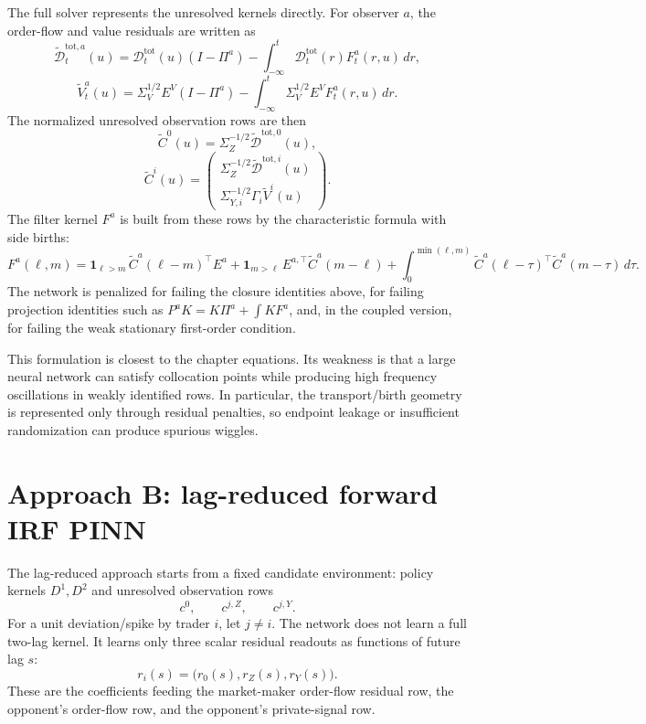 \documentclass[11pt]{article}
\newcommand{\Dt}{\widetilde{\mathcal D}}
\newcommand{\Vt}{\widetilde V}
\newcommand{\calD}{\mathcal D}
\newcommand{\dd}{\,d}
\begin{document}
The full solver represents the unresolved kernels directly.  For observer
\(a\), the order-flow and value residuals are written as
\[
  \Dt^{\mathrm{tot},a}_t(u)
  =
  \calD^{\mathrm{tot}}_t(u)(I-\Pi^a)
  -
  \int_{-\infty}^t
    \calD^{\mathrm{tot}}_t(r)F^a_t(r,u)\dd r,
\]
\[
  \Vt^a_t(u)
  =
  \Sigma_V^{1/2}E^V(I-\Pi^a)
  -
  \int_{-\infty}^t
    \Sigma_V^{1/2}E^V F^a_t(r,u)\dd r .
\]
The normalized unresolved observation rows are then
\[
  \widetilde C^0(u)=\Sigma_Z^{-1/2}\Dt^{\mathrm{tot},0}(u),
\]
\[
  \widetilde C^i(u)=
  \begin{pmatrix}
    \Sigma_Z^{-1/2}\Dt^{\mathrm{tot},i}(u)\\
    \Sigma_{Y,i}^{-1/2}\Gamma_i\Vt^i(u)
  \end{pmatrix}.
\]
The filter kernel \(F^a\) is built from these rows by the characteristic
formula with side births:
\[
  F^a(\ell,m)
  =
  \mathbf 1_{\ell>m}\,\widetilde C^a(\ell-m)^\top E^a
  +
  \mathbf 1_{m>\ell}\,E^{a,\top}\widetilde C^a(m-\ell)
  +
  \int_0^{\min(\ell,m)}
    \widetilde C^a(\ell-\tau)^\top
    \widetilde C^a(m-\tau)\dd\tau .
\]
The network is penalized for failing the closure identities above, for failing
projection identities such as \(P^a K=K\Pi^a+\int K F^a\), and, in the coupled
version, for failing the weak stationary first-order condition.

This formulation is closest to the chapter equations.  Its weakness is that a
large neural network can satisfy collocation points while producing high
frequency oscillations in weakly identified rows.  In particular, the
transport/birth geometry is represented only through residual penalties, so
endpoint leakage or insufficient randomization can produce spurious wiggles.

\section*{Approach B: lag-reduced forward IRF PINN}

The lag-reduced approach starts from a fixed candidate environment:
policy kernels \(D^1,D^2\) and unresolved observation rows
\[
  c^0,\qquad c^{j,Z},\qquad c^{j,Y}.
\]
For a unit deviation/spike by trader \(i\), let \(j\neq i\).  The network does
not learn a full two-lag kernel.  It learns only three scalar residual readouts
as functions of future lag \(s\):
\[
  r_i(s)=\bigl(r_0(s),r_Z(s),r_Y(s)\bigr).
\]
These are the coefficients feeding the market-maker order-flow residual row,
the opponent's order-flow row, and the opponent's private-signal row.
\end{document}
